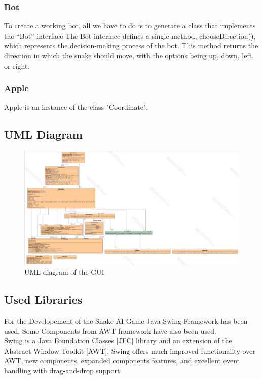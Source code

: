 \documentclass[a4paper,12pt]{article}
\begin{document}
\subsubsection{Bot}
To create a working bot, all we have to do is to generate a class that implements the “Bot”-interface
The Bot interface defines a single method, chooseDirection(), which represents the decision-making process of the bot.
This method returns the direction in which the snake should move, with the options being up, down, left, or right.
\subsubsection{Apple}
Apple is an instance of the class "Coordinate".
\subsection{UML Diagram}

\begin{figure}[h]
\centering
\includegraphics[scale=0.26]{ui.png}
\caption{UML diagram of the GUI}
\end{figure}

\subsection{Used Libraries}
For the Developement of the Snake AI Game Java Swing Framework has been used.
Some Components from AWT framework have also been used.\\ 
Swing is a Java Foundation Classes [JFC] library and an extension of the Abstract Window Toolkit [AWT].
Swing offers much-improved functionality over AWT, new components, expanded components features, and excellent event handling with drag-and-drop support.\cite{awt}

\end{document}
